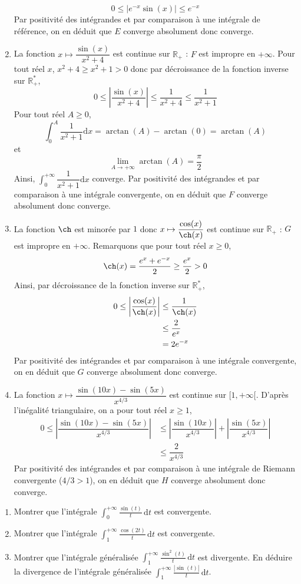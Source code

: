 \documentclass[a4paper,twoside,french,10pt]{VcCours}
\newcommand{\dx}{\text{d}x}
\newcommand{\dt}{\text{d}t}
\begin{document}
\begin{enumerate}
$$ 0 \leq \vert  e^{-x} \sin(x)  \vert \leq e^{-x}$$
Par positivité des intégrandes et par comparaison à une intégrale de référence, on en déduit que $E$ converge absolument donc converge.
\item La fonction $x \mapsto \dfrac{\sin(x)}{x^2+4}$ est continue sur $\mathbb{R}_+$ : $F$ est impropre en $+ \infty$. Pour tout réel $x$, $x^2+4 \geq x^2+1>0$ donc par décroissance de la fonction inverse sur $\mathbb{R}_+^*$,
$$ 0 \leq \left\vert \dfrac{\sin(x)}{x^2+4} \right\vert \leq \dfrac{1}{x^2+4} \leq \dfrac{1}{x^2+1}$$
Pour tout réel $A \geq 0$,
$$ \int_0^A \dfrac{1}{x^2+1} \dx = \arctan(A)- \arctan(0)= \arctan(A)$$
et 
$$ \lim_{A \rightarrow + \infty} \arctan(A) = \dfrac{\pi}{2}$$
Ainsi, $\int_0^{+ \infty} \dfrac{1}{x^2+1} \dx$ converge. Par positivité des intégrandes et par comparaison à une intégrale convergente, on en déduit que $F$ converge absolument donc converge.
\item La fonction $\ch$ est minorée par $1$ donc $x \mapsto \dfrac{\cos(x)}{\ch(x)}$ est continue sur $\mathbb{R}_+$ : $G$ est impropre en $+ \infty$. Remarquons que pour tout réel $x \geq 0$,
$$ \ch(x) = \dfrac{e^x+e^{-x}}{2} \geq \dfrac{e^x}{2} >0$$
Ainsi, par décroissance de la fonction inverse sur $\mathbb{R}_+^*$,
\begin{align*}
0 \leq \left\vert \dfrac{\cos(x)}{\ch(x)} \right\vert & \leq \dfrac{1}{\ch(x)} \\
& \leq \dfrac{2}{e^x} \\
& = 2e^{-x}
\end{align*}
Par positivité des intégrandes et par comparaison à une intégrale convergente, on en déduit que $G$ converge absolument donc converge.
\item La fonction $x\mapsto  \dfrac{\sin(10x)-\sin(5x)}{x^{4/3}}$ est continue sur $[1, + \infty[$. D'après l'inégalité triangulaire, on a pour tout réel $x \geq 1$,
\begin{align*}
0 \leq \left\vert  \dfrac{\sin(10x)-\sin(5x)}{x^{4/3}} \right\vert & \leq \left\vert  \dfrac{\sin(10x)}{x^{4/3}} \right\vert + \left\vert  \dfrac{\sin(5x)}{x^{4/3}} \right\vert \\
& \leq \dfrac{2}{x^{4/3}}
\end{align*}
Par positivité des intégrandes et par comparaison à une intégrale de Riemann convergente ($4/3>1$), on en déduit que $H$ converge absolument donc converge.
\end{enumerate}

\begin{Exercice}{} \begin{enumerate}
\item Montrer que l'intégrale $\int_0^{+ \infty} \frac{\sin(t)}{t}\, \dt$ est convergente.
\item Montrer que l'intégrale $\int_1^{+\infty}\frac{\cos(2t)}{t}\, \dt$ est convergente.
\item Montrer que l'intégrale généralisée $\int_1^{+\infty}\frac{\sin^2(t)}{t} \, \dt$ est divergente. En déduire la divergence de l'intégrale généralisée $\int_1^{+\infty}\frac{|\sin(t)|}{t} \, \dt$.
\end{enumerate}
\end{Exercice}
\end{document}
